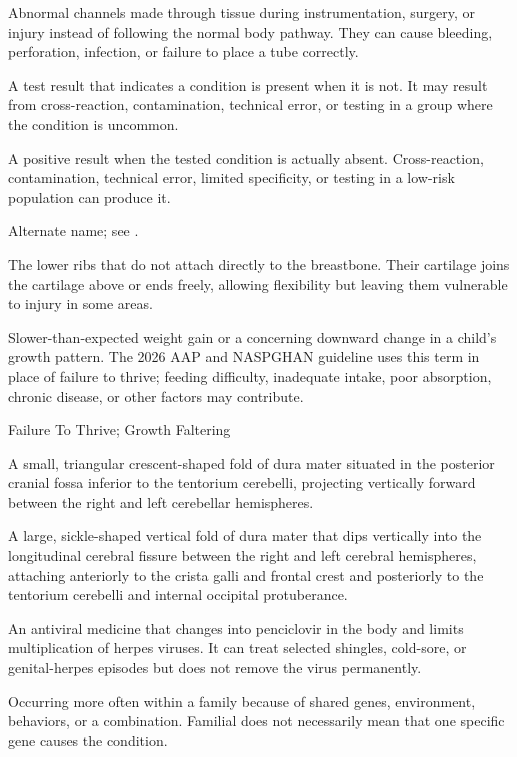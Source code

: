  Abnormal channels made through tissue during instrumentation, surgery, or injury instead of following the normal body pathway. They can cause bleeding, perforation, infection, or failure to place a tube correctly.

 A test result that indicates a condition is present when it is not. It may result from cross-reaction, contamination, technical error, or testing in a group where the condition is uncommon.

 A positive result when the tested condition is actually absent. Cross-reaction, contamination, technical error, limited specificity, or testing in a low-risk population can produce it.

 Alternate name; see .

 The lower ribs that do not attach directly to the breastbone. Their cartilage joins the cartilage above or ends freely, allowing flexibility but leaving them vulnerable to injury in some areas.

 Slower-than-expected weight gain or a concerning downward change in a child’s growth pattern. The 2026 AAP and NASPGHAN guideline uses this term in place of failure to thrive; feeding difficulty, inadequate intake, poor absorption, chronic disease, or other factors may contribute.

\synonyms
Failure To Thrive; Growth Faltering

 A small, triangular crescent-shaped fold of dura mater situated in the posterior cranial fossa inferior to the tentorium cerebelli, projecting vertically forward between the right and left cerebellar hemispheres.

 A large, sickle-shaped vertical fold of dura mater that dips vertically into the longitudinal cerebral fissure between the right and left cerebral hemispheres, attaching anteriorly to the crista galli and frontal crest and posteriorly to the tentorium cerebelli and internal occipital protuberance.

 An antiviral medicine that changes into penciclovir in the body and limits multiplication of herpes viruses. It can treat selected shingles, cold-sore, or genital-herpes episodes but does not remove the virus permanently.

 Occurring more often within a family because of shared genes, environment, behaviors, or a combination. Familial does not necessarily mean that one specific gene causes the condition.

